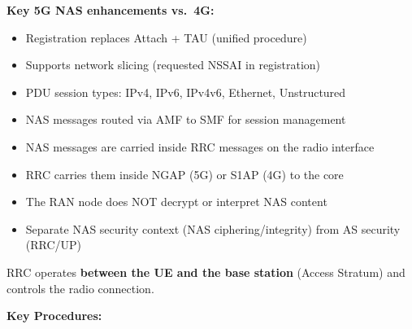 \textbf{Key 5G NAS enhancements vs. 4G:}

\begin{itemize}
\tightlist
\item
  Registration replaces Attach + TAU (unified procedure)
\item
  Supports network slicing (requested NSSAI in registration)
\item
  PDU session types: IPv4, IPv6, IPv4v6, Ethernet, Unstructured
\item
  NAS messages routed via AMF to SMF for session management
\end{itemize}




\begin{itemize}
\tightlist
\item
  NAS messages are carried inside RRC messages on the radio interface
\item
  RRC carries them inside NGAP (5G) or S1AP (4G) to the core
\item
  The RAN node does NOT decrypt or interpret NAS content
\item
  Separate NAS security context (NAS ciphering/\allowbreak{}integrity) from AS security (RRC/\allowbreak{}UP)
\end{itemize}



RRC operates \textbf{between the UE and the base station} (Access Stratum) and controls the radio connection.


\textbf{Key Procedures:}

